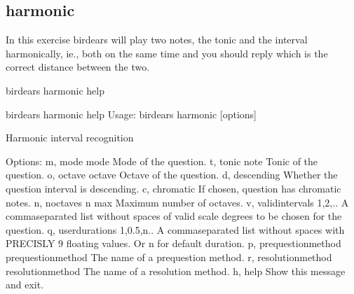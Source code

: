 \documentclass[letterpaper,10pt,english]{sphinxmanual}
\begin{document}
\subsection{harmonic}
\label{\detokenize{using:harmonic}}
In this exercise birdears will play two notes, the tonic and the interval
harmonically, ie., both on the same time and you should reply which is the
correct distance between the two.

\begin{sphinxVerbatim}[commandchars=\\\{\}]
birdears harmonic \PYGZhy{}\PYGZhy{}help
\end{sphinxVerbatim}

\begin{sphinxVerbatim}[commandchars=\\\{\}]
\PYGZdl{} birdears harmonic \PYGZhy{}\PYGZhy{}help
Usage: birdears harmonic [options]

  Harmonic interval recognition

Options:
  \PYGZhy{}m, \PYGZhy{}\PYGZhy{}mode \PYGZlt{}mode\PYGZgt{}               Mode of the question.
  \PYGZhy{}t, \PYGZhy{}\PYGZhy{}tonic \PYGZlt{}note\PYGZgt{}              Tonic of the question.
  \PYGZhy{}o, \PYGZhy{}\PYGZhy{}octave \PYGZlt{}octave\PYGZgt{}           Octave of the question.
  \PYGZhy{}d, \PYGZhy{}\PYGZhy{}descending                Whether the question interval is descending.
  \PYGZhy{}c, \PYGZhy{}\PYGZhy{}chromatic                 If chosen, question has chromatic notes.
  \PYGZhy{}n, \PYGZhy{}\PYGZhy{}n\PYGZus{}octaves \PYGZlt{}n max\PYGZgt{}         Maximum number of octaves.
  \PYGZhy{}v, \PYGZhy{}\PYGZhy{}valid\PYGZus{}intervals \PYGZlt{}1,2,..\PYGZgt{}  A comma\PYGZhy{}separated list without spaces
                                  of valid scale degrees to be chosen for the
                                  question.
  \PYGZhy{}q, \PYGZhy{}\PYGZhy{}user\PYGZus{}durations \PYGZlt{}1,0.5,n..\PYGZgt{}
                                  A comma\PYGZhy{}separated list without
                                  spaces with PRECISLY 9 floating values. Or
                                  \PYGZsq{}n\PYGZsq{} for default              duration.
  \PYGZhy{}p, \PYGZhy{}\PYGZhy{}prequestion\PYGZus{}method \PYGZlt{}prequestion\PYGZus{}method\PYGZgt{}
                                  The name of a pre\PYGZhy{}question method.
  \PYGZhy{}r, \PYGZhy{}\PYGZhy{}resolution\PYGZus{}method \PYGZlt{}resolution\PYGZus{}method\PYGZgt{}
                                  The name of a resolution method.
  \PYGZhy{}h, \PYGZhy{}\PYGZhy{}help                      Show this message and exit.


\end{sphinxVerbatim}
\end{document}
